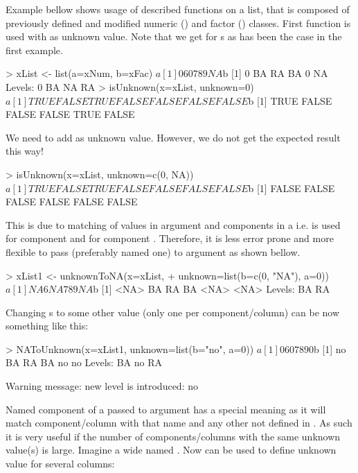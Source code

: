 \documentclass[a4paper]{report}
\begin{document}
\begin{article}
Example bellow shows usage of described functions on a list, that is
composed of previously defined and modified numeric () and
factor () classes. First function  is used with
 as unknown value. Note that we get  for s as
has been the case in the first example.

\begin{smallverbatim}
> xList <- list(a=xNum, b=xFac)
$a
[1]  0  6  0  7  8  9 NA

$b
[1] 0  BA RA BA 0  NA
Levels: 0 BA NA RA
> isUnknown(x=xList, unknown=0)
$a
[1]  TRUE FALSE  TRUE FALSE FALSE FALSE FALSE

$b
[1]  TRUE FALSE FALSE FALSE  TRUE FALSE
\end{smallverbatim}

We need to add  as unknown value. However, we do not get the
expected result this way!

\begin{smallverbatim}
> isUnknown(x=xList, unknown=c(0, NA))
$a
[1]  TRUE FALSE  TRUE FALSE FALSE FALSE FALSE

$b
[1] FALSE FALSE FALSE FALSE FALSE FALSE
\end{smallverbatim}

This is due to matching of values in argument  and components
in a  i.e.  is used for component  and 
for component .  Therefore, it is less error prone and more
flexible to pass  (preferably named one) to argument
 as shown bellow.

\begin{smallverbatim}
> xList1 <- unknownToNA(x=xList,
+             unknown=list(b=c(0, "NA"), a=0))
$a
[1] NA  6 NA  7  8  9 NA

$b
[1] <NA> BA   RA   BA   <NA> <NA>
Levels: BA RA
\end{smallverbatim}

Changing s to some other value (only one per component/column) can
be now something like this:

\begin{smallverbatim}
> NAToUnknown(x=xList1, unknown=list(b="no", a=0))
$a
[1] 0 6 0 7 8 9 0

$b
[1] no BA RA BA no no
Levels: BA no RA

Warning message:
new level is introduced: no
\end{smallverbatim}

Named component  of a  passed to argument
 has a special meaning as it will match component/column with
that name and any other not defined in . As such it is very
useful if the number of components/columns with the same unknown value(s)
is large. Imagine a wide  named . Now
 can be used to define unknown value for several columns:


\end{article}
\end{document}
